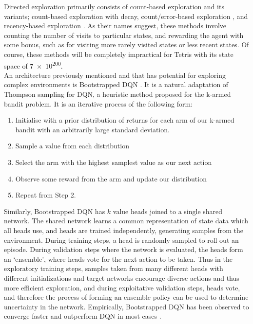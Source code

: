 \documentclass[12pt]{article}
\begin{document}
Directed exploration primarily consists of count-based exploration \autocite{Thrun92efficientexploration} and its variants; count-based exploration with decay, count/error-based exploration \autocite{schmidhuber1991adaptive}, and recency-based exploration \autocite{sutton1990integrated}. As their names suggest, these methods involve counting the number of visits to particular states, and rewarding the agent with some bonus, such as for visiting more rarely visited states or less recent states. Of course, these methods will be completely impractical for Tetris with its state space of \num{7e200}.  \\\newline
An architecture previously mentioned and that has potential for exploring complex environments is Bootstrapped DQN \autocite{osband2016deep}. It is a natural adaptation of Thompson sampling \autocite{NIPS2011_e53a0a29} for DQN, a heuristic method proposed for the k-armed bandit problem. It is an iterative process of the following form:
\begin{enumerate}
    \item Initialise with a prior distribution of returns for each arm of our k-armed bandit with an arbitrarily large standard deviation. 
    \item Sample a value from each distribution
    \item Select the arm with the highest samplest value as our next action
    \item Observe some reward from the arm and update our distribution
    \item Repeat from Step 2. 
\end{enumerate}
Similarly, Bootstrapped DQN has $k$ value heads joined to a single shared network. The shared network learns a common representation of state data which all heads use, and heads are trained independently, generating samples from the environment. During training steps, a head is randomly sampled to roll out an episode. During validation steps where the network is evaluated, the heads form an `ensemble', where heads vote for the next action to be taken. Thus in the exploratory training steps, samples taken from many different heads with different initializations and target networks encourage diverse actions and thus more efficient exploration, and during exploitative validation steps, heads vote, and therefore the process of forming an ensemble policy can be used to determine uncertainty in the network. Empirically, Bootstrapped DQN has been observed to converge faster and outperform DQN in most cases \autocite{osband2016deep}.\\\newline
\end{document}
